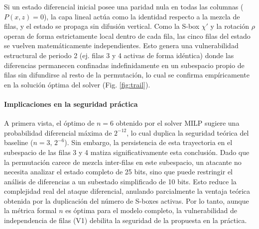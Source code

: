 \documentclass[journal,compsoc]{IEEEtran}
\begin{document}
Si un estado diferencial inicial posee una paridad nula en todas las columnas ($P(x, z) = 0$), la capa lineal actúa como la identidad respecto a la mezcla de filas, y el estado se propaga sin difusión vertical. Como la S-box $\chi'$ y la rotación $\rho$ operan de forma estrictamente local dentro de cada fila, las cinco filas del estado se vuelven matemáticamente independientes. Esto genera una vulnerabilidad estructural de periodo 2 (ej. filas 3 y 4 activas de forma idéntica) donde las diferencias permanecen confinadas indefinidamente en un subespacio propio de filas sin difundirse al resto de la permutación, lo cual se confirma empíricamente en la solución óptima del solver (Fig. \ref{fig:trail}).

\paragraph{Implicaciones en la seguridad práctica}
A primera vista, el óptimo de $n=6$ obtenido por el solver MILP sugiere una probabilidad diferencial máxima de $2^{-12}$, lo cual duplica la seguridad teórica del baseline ($n=3$, $2^{-6}$). Sin embargo, la persistencia de esta trayectoria en el subespacio de las filas 3 y 4 matiza significativamente esta conclusión. Dado que la permutación carece de mezcla inter-filas en este subespacio, un atacante no necesita analizar el estado completo de 25 bits, sino que puede restringir el análisis de diferencias a un subestado simplificado de 10 bits. Esto reduce la complejidad real del ataque diferencial, anulando parcialmente la ventaja teórica obtenida por la duplicación del número de S-boxes activas. Por lo tanto, aunque la métrica formal $n$ es óptima para el modelo completo, la vulnerabilidad de independencia de filas (V1) debilita la seguridad de la propuesta en la práctica.
\end{document}
